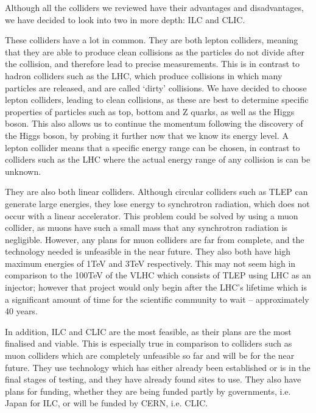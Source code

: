 Although all the colliders we reviewed have their advantages and disadvantages, we have decided to look into two in more depth: ILC and CLIC. 

These colliders have a lot in common. They are both lepton colliders, meaning that they are able to produce clean collisions as the particles do not divide after the collision, and therefore lead to precise measurements. This is in contrast to hadron colliders such as the LHC, which produce collisions in which many particles are released, and are called ‘dirty’ collisions. We have decided to choose lepton colliders, leading to clean collisions, as these are best to determine specific properties of particles such as top, bottom and Z quarks, as well as the Higgs boson. This also allows us to continue the momentum following the discovery of the Higgs boson, by probing it further now that we know its energy level. A lepton collider means that a specific energy range can be chosen, in contrast to colliders such as the LHC where the actual energy range of any collision is can be unknown.

They are also both linear colliders. Although circular colliders such as TLEP can generate large energies, they lose energy to synchrotron radiation, which does not occur with a linear accelerator. This problem could be solved by using a muon collider, as muons have such a small mass that any synchrotron radiation is negligible. However, any plans for muon colliders are far from complete, and the technology needed is unfeasible in the near future. They also both have high maximum energies of 1TeV and 3TeV respectively. This may not seem high in comparison to the 100TeV of the VLHC which consists of TLEP using LHC as an injector; however that project would only begin after the LHC’s lifetime which is a significant amount of time for the scientific community to wait – approximately 40 years.

In addition, ILC and CLIC are the most feasible, as their plans are the most finalised and viable. This is especially true in comparison to colliders such as muon colliders which are completely unfeasible so far and will be for the near future. They use technology which has either already been established or is in the final stages of testing, and they have already found sites to use. They also have plans for funding, whether they are being funded partly by governments, i.e. Japan for ILC, or will be funded by CERN, i.e. CLIC.

